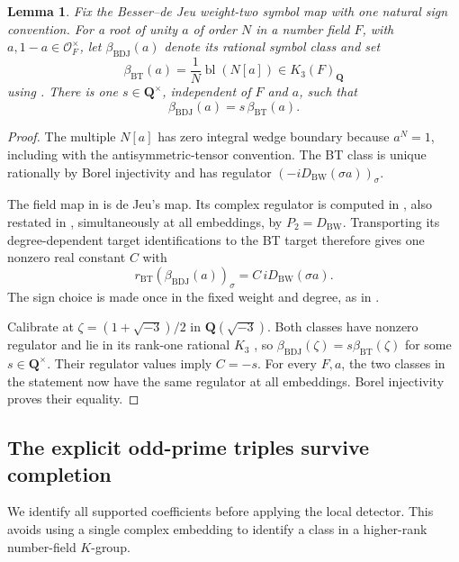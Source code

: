 \documentclass[11pt,a4paper]{amsart}
\numberwithin{equation}{section}
\newtheorem{lemma}[theorem]{Lemma}
\theoremstyle{definition}
\theoremstyle{remark}
\newcommand{\Q}{\mathbf Q}
\newcommand{\OO}{\mathcal O}
\begin{document}
\begin{lemma}\label{d3:lem:cyclotomicnormalization}
Fix the Besser--de Jeu weight-two symbol map with one natural
sign convention. For a root of unity $a$ of order $N$ in a
number field $F$, with $a,1-a\in\OO_F^\times$, let
$\beta_{\mathrm{BDJ}}(a)$ denote its rational symbol class and set
\[
 \beta_{\mathrm{BT}}(a)=\frac1N\operatorname{bl}(N[a])
       \in K_3(F)_{\Q}
\]
using \cite[Theorem~4.9]{BunkeTamme}.
There is one $s\in\Q^\times$, independent of $F$ and $a$, such that
\[
 \beta_{\mathrm{BDJ}}(a)=s\,\beta_{\mathrm{BT}}(a).
\]
\end{lemma}
\begin{proof}
The multiple $N[a]$ has zero integral wedge boundary because
$a^N=1$, including with the antisymmetric-tensor convention.
The BT class is unique rationally by Borel injectivity
\cite[Section~6]{BunkeTamme} and has
regulator $(-iD_{\mathrm{BW}}(\sigma a))_\sigma$.

The field map in \cite[equation~(1.1), Theorem~1.10(1)]{BesserDeJeu}
is de Jeu's map. Its complex regulator is computed in
\cite[Proposition~4.1 and Remark~5.2]{DeJeuWedge}, also restated in \cite[Theorem~2.3]{DeJeuCurves}, simultaneously
at all embeddings, by $P_2=D_{\mathrm{BW}}$.
Transporting its degree-dependent target identifications to the
BT target therefore gives one nonzero real constant $C$ with
\[
 r_{\mathrm{BT}}(\beta_{\mathrm{BDJ}}(a))_\sigma
       =C\,iD_{\mathrm{BW}}(\sigma a).
\]
The sign choice is made once in the fixed weight and degree,
as in \cite[Remark~1.7]{BesserDeJeu}.

Calibrate at $\zeta=(1+\sqrt{-3})/2$ in $\Q(\sqrt{-3})$.
Both classes have nonzero regulator and lie in its rank-one
rational $K_3$ \cite[Proposition~12.2]{Borel}, so
$\beta_{\mathrm{BDJ}}(\zeta)=s\beta_{\mathrm{BT}}(\zeta)$
for some $s\in\Q^\times$.
Their regulator values imply $C=-s$.
For every $F,a$, the two classes in the statement now have
the same regulator at all embeddings. Borel injectivity proves
their equality.
\end{proof}


\subsection{The explicit odd-prime triples survive completion}
\label{d3:sec:explicitoddcomplete}

We identify all supported coefficients before applying the local
detector. This avoids using a single complex embedding to identify
a class in a higher-rank number-field $K$-group.
\end{document}
